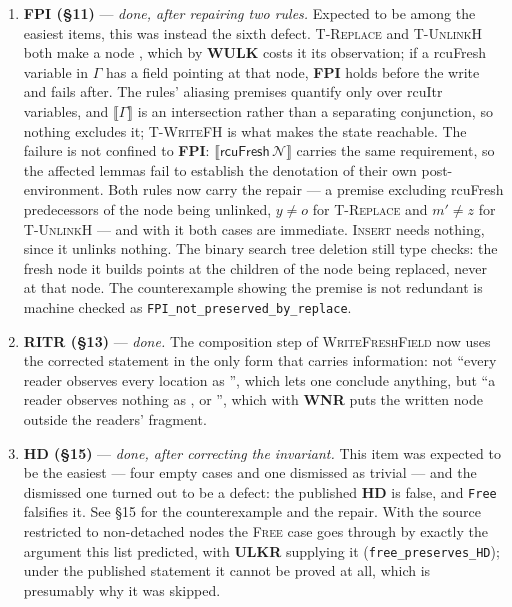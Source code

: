 \begin{enumerate}
\item \textbf{FPI (\S11)} --- \emph{done, after repairing two rules.}  Expected
  to be among the easiest items, this was instead the sixth defect.  \textsc{T-Replace} and \textsc{T-UnlinkH} both make a node
  \unlk, which by \textbf{WULK} costs it its \itr{} observation; if a
  \textsf{rcuFresh} variable in $\Gamma$ has a field pointing at that node,
  \textbf{FPI} holds before the write and fails after.  The rules' aliasing
  premises quantify only over \textsf{rcuItr} variables, and $\llbracket \Gamma
  \rrbracket$ is an intersection rather than a separating conjunction, so
  nothing excludes it; \textsc{T-WriteFH} is what makes the state reachable.
  The failure is not confined to \textbf{FPI}: $\llbracket
  \textsf{rcuFresh}\,\mathcal{N}\rrbracket$ carries the same requirement, so the
  affected lemmas fail to establish the denotation of their own
  post-environment.  Both rules now carry the repair --- a premise excluding
  \textsf{rcuFresh} predecessors of the node being unlinked, $y \neq o$ for
  \textsc{T-Replace} and $m' \neq z$ for \textsc{T-UnlinkH} --- and with it both
  cases are immediate.  \textsc{Insert} needs nothing, since it unlinks nothing.
  The binary search tree deletion still type checks: the fresh node it builds
  points at the children of the node being replaced, never at that node.  The
  counterexample showing the premise is not redundant is machine checked as
  \texttt{FPI\_not\_preserved\_by\_replace}.

\item \textbf{RITR (\S13)} --- \emph{done.}  The composition step of
  \textsc{WriteFreshField} now uses the corrected statement in the only form
  that carries information: not ``every reader observes every location as
  \itr'', which lets one conclude anything, but ``a reader observes nothing as
  \unlk, \frbl{} or \frsh'', which with \textbf{WNR} puts the written node
  outside the readers' fragment.

\item \textbf{HD (\S15)} --- \emph{done, after correcting the invariant.}  This
  item was expected to be the easiest --- four empty cases and one dismissed as
  trivial --- and the dismissed one turned out to be a defect: the
  published \textbf{HD} is false, and \texttt{Free} falsifies it.  See \S15 for
  the counterexample and the repair.  With the source restricted to non-detached
  nodes the \textsc{Free} case goes through by exactly the argument this list
  predicted, with \textbf{ULKR} supplying it
  (\texttt{free\_preserves\_HD}); under the published statement it cannot be
  proved at all, which is presumably why it was skipped.


\end{enumerate}
